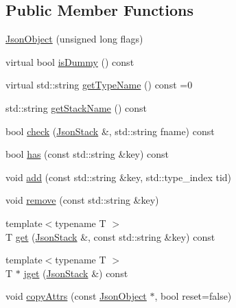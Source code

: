 \subsection*{Public Member Functions}
\begin{DoxyCompactItemize}
\item 
\mbox{\hyperlink{classHurricane_1_1JsonObject_a57d9c022204b30d4b253c2588f2c1215}{Json\+Object}} (unsigned long flags)
\item 
virtual bool \mbox{\hyperlink{classHurricane_1_1JsonObject_a8f0949b75f5900e4ef87196e949cfa6b}{is\+Dummy}} () const
\item 
virtual std\+::string \mbox{\hyperlink{classHurricane_1_1JsonObject_a947e1c3f8dbae63bb2d086b5b827a2a5}{get\+Type\+Name}} () const =0
\item 
std\+::string \mbox{\hyperlink{classHurricane_1_1JsonObject_a34c4e38611238021df8cc69fc32f5e48}{get\+Stack\+Name}} () const
\item 
bool \mbox{\hyperlink{classHurricane_1_1JsonObject_a6ac9230d36590f83fbe1561b6c1bb0e5}{check}} (\mbox{\hyperlink{classHurricane_1_1JsonStack}{Json\+Stack}} \&, std\+::string fname) const
\item 
bool \mbox{\hyperlink{classHurricane_1_1JsonObject_ac0b8816eab2cbcabf18d5421a59aa780}{has}} (const std\+::string \&key) const
\item 
void \mbox{\hyperlink{classHurricane_1_1JsonObject_a39ed04c118b19f1b6010b7f3336c360f}{add}} (const std\+::string \&key, std\+::type\+\_\+index tid)
\item 
void \mbox{\hyperlink{classHurricane_1_1JsonObject_a6435e5a8655a6b42b61d55e7fd673c65}{remove}} (const std\+::string \&key)
\item 
{\footnotesize template$<$typename T $>$ }\\T \mbox{\hyperlink{classHurricane_1_1JsonObject_af599fb8e2f3aca9c00dc628927367cb8}{get}} (\mbox{\hyperlink{classHurricane_1_1JsonStack}{Json\+Stack}} \&, const std\+::string \&key) const
\item 
{\footnotesize template$<$typename T $>$ }\\T $\ast$ \mbox{\hyperlink{classHurricane_1_1JsonObject_a7a3fe903ceb00a3ebff66d1696edf682}{jget}} (\mbox{\hyperlink{classHurricane_1_1JsonStack}{Json\+Stack}} \&) const
\item 
void \mbox{\hyperlink{classHurricane_1_1JsonObject_a380ea9ac8689e1e9cad892edf0024c08}{copy\+Attrs}} (const \mbox{\hyperlink{classHurricane_1_1JsonObject}{Json\+Object}} $\ast$, bool reset=false)
\item 

\end{DoxyCompactItemize}
